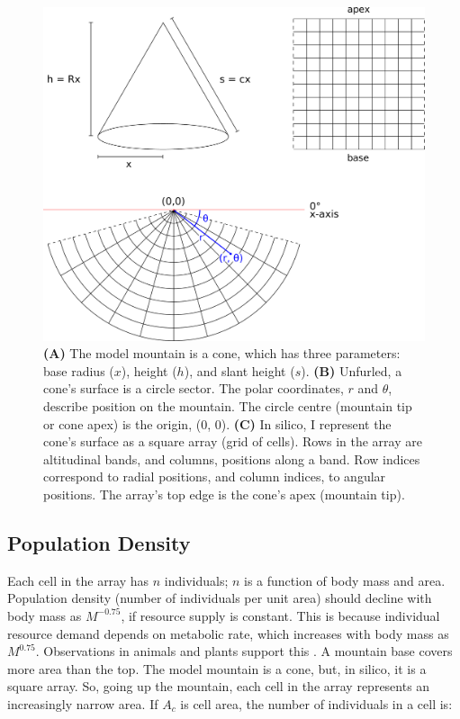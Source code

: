 \documentclass[11pt]{article}
\begin{document}
\begin{figure}[!hbtp]

	\includegraphics[width=1\linewidth]{ConeGrid_r_theta.pdf}

	\caption{\textbf{(A)} The model mountain is a cone, which has three parameters: base radius ($x$), height ($h$), and slant height ($s$). \textbf{(B)} Unfurled, a cone's surface is a circle sector. The polar coordinates, $r$ and $\theta$, describe position on the mountain. The circle centre (mountain tip or cone apex) is the origin, (0, 0). \textbf{(C)} In silico, I represent the cone's surface as a square array (grid of cells). Rows in the array are altitudinal bands, and columns, positions along a band. Row indices correspond to radial positions, and column indices, to angular positions. The array's top edge is the cone's apex (mountain tip).}
\label{Model}
\end{figure}

\subsection{Population Density}
Each cell in the array has $n$ individuals; $n$ is a function of body mass and area. Population density (number of individuals per unit area) should decline with body mass as $M^{-0.75}$, if resource supply is constant. This is because individual resource demand depends on metabolic rate, which increases with body mass as $M^{0.75}$. Observations in animals and plants support this \cite{enquist1998allometric, damuth1987interspecific}. A mountain base covers more area than the top. The model mountain is a cone, but, in silico, it is a square array. So, going up the mountain, each cell in the array represents an increasingly narrow area. If $A_c$ is cell area, the number of individuals in a cell is:
\end{document}
